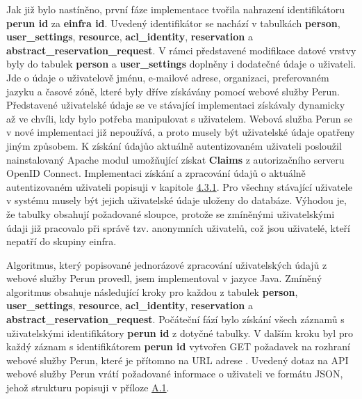 \documentclass[
  printed, %
  twoside, %
  table,   %
  nolof,     %
  nolot,     %
]{fithesis3}
\begin{document}
\par

Jak již bylo nastíněno, první fáze implementace tvořila nahrazení identifikátoru \textbf{perun id} za \textbf{einfra id}. Uvedený identifikátor se nachází v tabulkách \textbf{person}, \textbf{user\_settings}, \textbf{resource}, \textbf{acl\_identity}, \textbf{reservation} a \textbf{abstract\_reservation\_request}. V rámci představené modifikace datové vrstvy byly do tabulek \textbf{person} a \textbf{user\_settings} doplněny i dodatečné údaje o uživateli. Jde o údaje o uživatelově jménu, e-mailové adrese, organizaci, preferovaném jazyku a časové zóně, které byly dříve získávány pomocí webové služby Perun. Představené uživatelské údaje se ve stávající implementaci získávaly dynamicky až ve chvíli, kdy bylo potřeba manipulovat s uživatelem. Webová služba Perun se v nové implementaci již nepoužívá, a proto musely být uživatelské údaje opatřeny jiným způsobem. K získání údajů\break o aktuálně autentizovaném uživateli posloužil nainstalovaný Apache modul umožňující získat \textbf{Claims} z autorizačního serveru OpenID Connect. Implementaci získání a zpracování údajů o aktuálně autentizovaném uživateli popisuji v kapitole \hyperref[ShongoImpl-authn]{4.3.1}. Pro všechny stávající uživatele v systému  musely být jejich uživatelské údaje uloženy do databáze. Výhodou je, že tabulky obsahují požadované sloupce, protože se zmíněnými uživatelskými údaji již pracovalo při správě tzv. anonymních uživatelů, což jsou uživatelé, kteří nepatří do skupiny einfra. 
\par

Algoritmus, který popisované jednorázové zpracování uživatelských údajů z webové služby Perun provedl, jsem implementoval v jazyce Java. Zmíněný algoritmus obsahuje následující kroky pro každou z tabulek \textbf{person}, \textbf{user\_settings}, \textbf{resource}, \textbf{acl\_identity}, \textbf{reservation} a \textbf{abstract\_reservation\_request}. Počáteční fází bylo získání všech záznamů s uživatelskými identifikátory \textbf{perun id} z dotyčné tabulky. V dalším kroku byl pro každý záznam s identifikátorem \textbf{perun id} vytvořen GET požadavek na rozhraní webové služby Perun, které je přítomno na URL adrese . Uvedený dotaz na API webové služby Perun vrátí požadované informace o uživateli ve formátu JSON, jehož strukturu popisuji v příloze \hyperref[table:perunws:user]{A.1}.

\par
\end{document}
